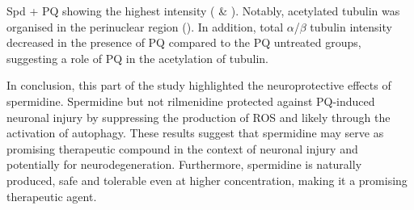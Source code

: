 Spd + PQ showing the highest intensity ( \& ). Notably, acetylated tubulin was organised in the perinuclear region (). In addition, total $\alpha$/$\beta$ tubulin intensity decreased in the presence of PQ compared to the PQ untreated groups, suggesting a role of PQ in the acetylation of tubulin.

In conclusion, this part of the study highlighted the neuroprotective effects of spermidine. Spermidine but not rilmenidine protected against PQ-induced neuronal injury by suppressing the production of ROS and likely through the activation of autophagy. These results suggest that spermidine may serve as promising therapeutic compound  in the context of neuronal injury and potentially for neurodegeneration. Furthermore, spermidine is naturally produced, safe and tolerable even at higher concentration, making it a promising therapeutic agent.